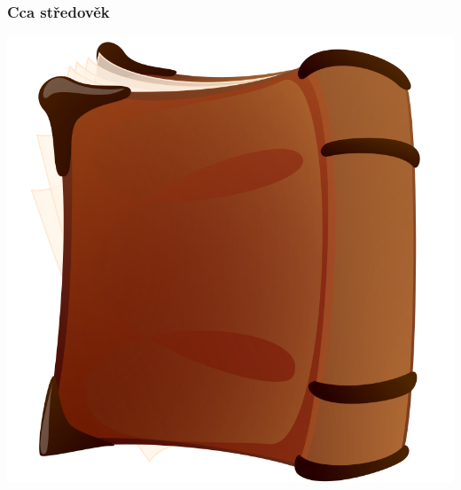 \documentclass{beamer}
\begin{document}
\begin{frame}
\frametitle{Cca středověk}
\begin{center}
\includegraphics[height=.7\paperheight]{Anonymous_old_book}
\end{center}
\end{frame}
\end{document}
